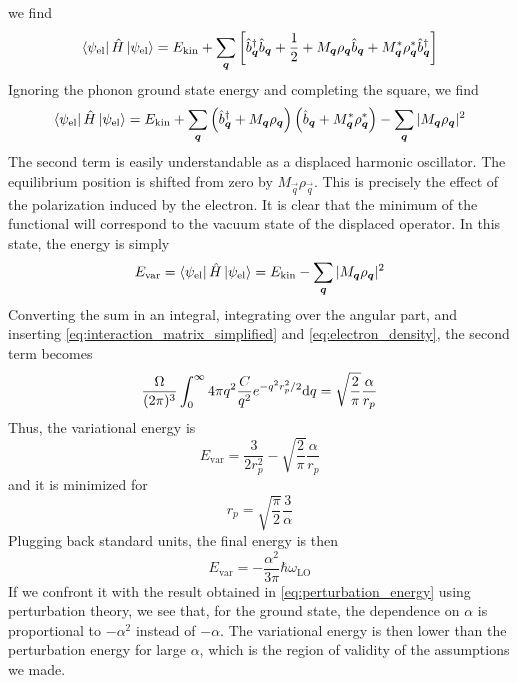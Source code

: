 we find
\begin{equation}
    \bra{\psi_\text{el}} \hat{H} \ket{\psi_\text{el}} = E_\text{kin} + \sum_{\mathbf{\boldsymbol{q}}} \left[  \hat{b}^\dagger_{ \mathbf{\boldsymbol{q}}} \hat{b}_{ \mathbf{\boldsymbol{q}}} + \frac{1}{2} + M_{\mathbf{\boldsymbol{q}}} \rho_{\mathbf{\boldsymbol{q}}} \hat{b}_{\mathbf{\boldsymbol{q}}} +  M^*_{\mathbf{\boldsymbol{q}}} \rho^*_{\mathbf{\boldsymbol{q}}} \hat{b}^\dagger_{\mathbf{\boldsymbol{q}}} \right]
\end{equation}
Ignoring the phonon ground state energy and completing the square, we find
\begin{equation}
    \bra{\psi_\text{el}} \hat{H} \ket{\psi_\text{el}} = E_\text{kin} + \sum_{\mathbf{\boldsymbol{q}}} \left( \hat{b}^\dagger_{\mathbf{\boldsymbol{q}}} + M_{\mathbf{\boldsymbol{q}}}\rho_{\mathbf{\boldsymbol{q}}} \right)\left( \hat{b}_{\mathbf{\boldsymbol{q}}} + M^*_{\mathbf{\boldsymbol{q}}}\rho^*_{\mathbf{\boldsymbol{q}}} \right) - \sum_{\mathbf{\boldsymbol{q}}} |M_{\mathbf{\boldsymbol{q}}}\rho_{\mathbf{\boldsymbol{q}}}|^2
\end{equation}
The second term is easily understandable as a displaced harmonic oscillator. The equilibrium position is shifted from zero by $M_\vec{q}\rho_\vec{q}$. This is precisely the effect of the polarization induced by the electron. It is clear that the minimum of the functional will correspond to the vacuum state of the displaced operator. In this state, the energy is simply
\begin{equation}
    E_\text{var} = \bra{\psi_\text{el}} \hat{H} \ket{\psi_\text{el}} = E_\text{kin} - \sum_{\mathbf{\boldsymbol{q}}} |M_{\mathbf{\boldsymbol{q}}}\rho_{\mathbf{\boldsymbol{q}}}|^2
\end{equation}
Converting the sum in an integral, integrating over the angular part, and inserting \cref{eq:interaction_matrix_simplified} and \cref{eq:electron_density}, the second term becomes
\begin{equation}
    \frac{\Omega}{(2\pi)^3} \int_0^\infty  4\pi q^2 \frac{C}{q^2} e^{-q^2r_p^2/2} \differential q = \sqrt{\frac{2}{\pi}} \frac{\alpha}{r_p}
\end{equation}
Thus, the variational energy is
\begin{equation}
    E_\text{var} = \frac{3}{2r_p^2} - \sqrt{\frac{2}{\pi}} \frac{\alpha}{r_p}
\end{equation}
and it is minimized for
\begin{equation}
    r_p = \sqrt{\frac{\pi}{2}}\frac{3}{\alpha}
\end{equation}
Plugging back standard units, the final energy is then
\begin{equation}
    E_\text{var} = -\frac{\alpha^2}{3\pi} \hbar\omega_\text{LO}
\end{equation}
If we confront it with the result obtained in \cref{eq:perturbation_energy} using perturbation theory, we see that, for the ground state, the dependence on $\alpha$ is proportional to $-\alpha^2$ instead of $-\alpha$. The variational energy is then lower than the perturbation energy for large $\alpha$, which is the region of validity of the assumptions we made.